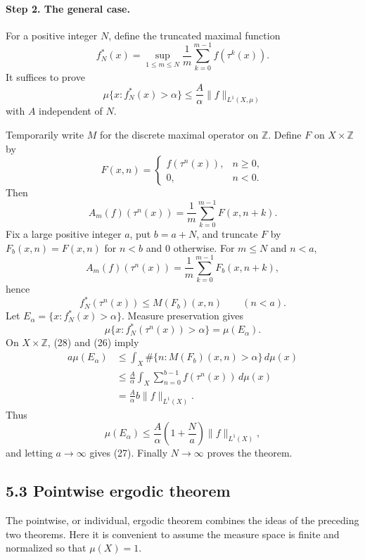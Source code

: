 \documentclass[11pt,openany]{book}
\begin{document}
\paragraph{Step 2. The general case.}
For a positive integer $N$, define the truncated maximal function
\[
f_N^*(x)=\sup_{1\leq m\leq N}\frac1m\sum_{k=0}^{m-1}f(\tau^k(x)).
\]
It suffices to prove
\begin{equation}
\mu\{x:f_N^*(x)>\alpha\}\leq\frac{A}{\alpha}\|f\|_{L^1(X,\mu)}
\tag{27}
\end{equation}
with $A$ independent of $N$.

Temporarily write $M$ for the discrete maximal operator on $\mathbb Z$. Define $F$ on $X\times\mathbb Z$ by
\[
F(x,n)=
\begin{cases}
f(\tau^n(x)),&n\geq0,\\
0,&n<0.
\end{cases}
\]
Then
\[
A_m(f)(\tau^n(x))=\frac1m\sum_{k=0}^{m-1}F(x,n+k).
\]
Fix a large positive integer $a$, put $b=a+N$, and truncate $F$ by $F_b(x,n)=F(x,n)$ for $n<b$ and $0$ otherwise. For $m\leq N$ and $n<a$,
\[
A_m(f)(\tau^n(x))=\frac1m\sum_{k=0}^{m-1}F_b(x,n+k),
\]
hence
\begin{equation}
f_N^*(\tau^n(x))\leq M(F_b)(x,n)
\qquad(n<a).
\tag{28}
\end{equation}
Let $E_\alpha=\{x:f_N^*(x)>\alpha\}$. Measure preservation gives
\[
\mu\{x:f_N^*(\tau^n(x))>\alpha\}=\mu(E_\alpha).
\]
On $X\times\mathbb Z$, (28) and (26) imply
\begin{align*}
a\mu(E_\alpha)
&\leq\int_X\#\{n:M(F_b)(x,n)>\alpha\}\,d\mu(x)\\
&\leq\frac{A}{\alpha}\int_X\sum_{n=0}^{b-1}f(\tau^n(x))\,d\mu(x)\\
&=\frac{A}{\alpha}b\|f\|_{L^1(X)}.
\end{align*}
Thus
\[
\mu(E_\alpha)\leq\frac{A}{\alpha}\left(1+\frac Na\right)\|f\|_{L^1(X)},
\]
and letting $a\to\infty$ gives (27). Finally $N\to\infty$ proves the theorem.

\subsection*{5.3 Pointwise ergodic theorem}

The pointwise, or individual, ergodic theorem combines the ideas of the preceding two theorems. Here it is convenient to assume the measure space is finite and normalized so that $\mu(X)=1$.
\end{document}
